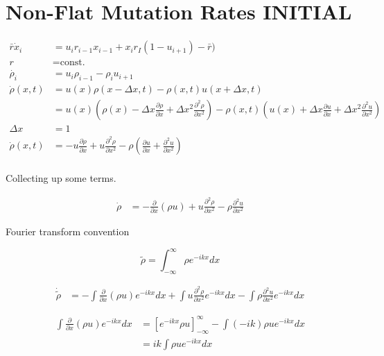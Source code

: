 \documentclass[a4paper]{article}
\begin{document}
\section{Non-Flat Mutation Rates INITIAL}

\begin{align*}
\bar{r} \dot{x}_i & = u_{i} r_{i-1} x_{i-1} + x_{i}  r_I ( 1- u_{i+1} ) - \bar{r} ) \\
r & = \text{const.} \\
\dot{\rho _i} & = u_i \rho _{i-1} - \rho _{i} u_{i+1} \\
\dot{\rho} (x, t) & = u(x) \rho (x - \Delta x, t) - \rho (x,t) u(x + \Delta x , t) \\
& = u(x) \left( \rho (x) - \Delta x \frac{\partial \rho}{\partial x} + \Delta x ^2 \frac{\partial ^2 \rho}{\partial x ^ 2} \right) - \rho (x, t) \left( u(x) + \Delta x \frac{\partial u}{\partial x} + \Delta x ^2 \frac{\partial ^2 u }{\partial x ^2} \right) \\
\Delta x & = 1 \\
\dot{\rho} (x, t) & = - u \frac{\partial \rho}{\partial x} + u \frac{\partial ^2 \rho}{\partial x ^2} - \rho \left( \frac{\partial u}{\partial x} + \frac{\partial ^2 u}{\partial x ^2} \right) \\
\end{align*}

Collecting up some terms. 

\begin{align*}
\dot{\rho} & = - \frac{\partial}{\partial x} ( \rho u ) + u \frac{\partial ^2 \rho}{\partial x ^2} - \rho \frac{\partial ^2 u}{\partial x ^2}
\end{align*}

Fourier transform convention 

\begin{equation}
\tilde{\rho} = \int _{- \infty} ^{\infty} \rho e ^{-ikx } dx 
\end{equation}

\begin{align*}
\dot{\tilde{\rho}} & = - \int \frac{\partial}{\partial x} (\rho u) e^{-ikx} dx + \int u \frac{\partial ^2 \rho}{\partial x^2} e^{-ikx} dx - \int \rho \frac{\partial ^2 u}{\partial x ^2 } e^{-ikx} dx
\end{align*}

\begin{align*}
\int \frac{\partial}{\partial x} (\rho u) e^{-ikx} dx & = \left[ e^{-ikx} \rho u \right] _{-\infty} ^{\infty} - \int (-ik) \rho u e^{-ikx} dx \\
& = ik \int \rho u e^{-ikx} dx
\end{align*}
\end{document}
